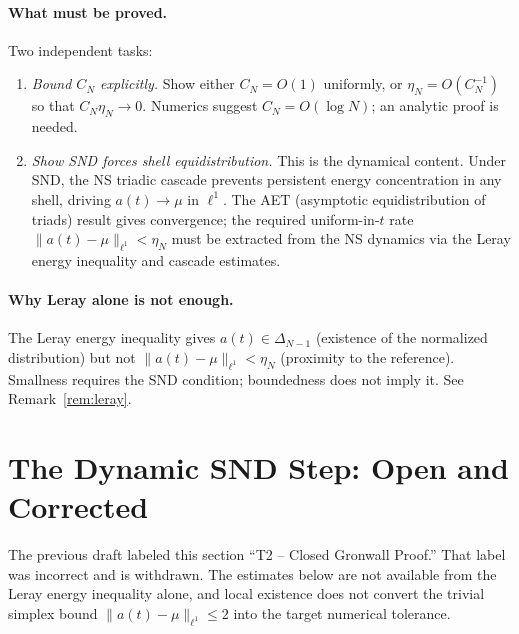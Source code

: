 \documentclass[12pt]{amsart}
\theoremstyle{definition}
\begin{document}
\paragraph{What must be proved.}
Two independent tasks:
\begin{enumerate}
\item[\textbf{(T1)}] \textit{Bound $C_N$ explicitly.}
  Show either $C_N=O(1)$ uniformly, or $\eta_N=O(C_N^{-1})$
  so that $C_N\eta_N\to0$.
  Numerics suggest $C_N=O(\log N)$; an analytic proof is needed.

\item[\textbf{(T2)}] \textit{Show SND forces shell equidistribution.}
  This is the dynamical content.
  Under SND, the NS triadic cascade prevents persistent energy
  concentration in any shell, driving $a(t)\to\mu$ in $\ell^1$.
  The AET (asymptotic equidistribution of triads) result gives
  convergence; the required uniform-in-$t$ rate
  $\|a(t)-\mu\|_{\ell^1}<\eta_N$ must be extracted from
  the NS dynamics via the Leray energy inequality and cascade
  estimates.
\end{enumerate}

\paragraph{Why Leray alone is not enough.}
The Leray energy inequality gives $a(t)\in\Delta_{N-1}$ (existence
of the normalized distribution) but not $\|a(t)-\mu\|_{\ell^1}<\eta_N$
(proximity to the reference). Smallness requires the SND condition;
boundedness does not imply it. See Remark~\ref{rem:leray}.

\section{The Dynamic SND Step: Open and Corrected}
\label{sec:T2}

The previous draft labeled this section ``T2 -- Closed Gronwall Proof.''
That label was incorrect and is withdrawn.  The estimates below are not
available from the Leray energy inequality alone, and local existence
does not convert the trivial simplex bound
$\|a(t)-\mu\|_{\ell^1}\le 2$ into the target numerical tolerance.
\end{document}
